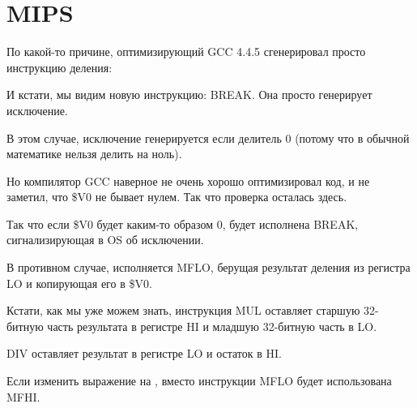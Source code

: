 ﻿\section{MIPS}

По какой-то причине, оптимизирующий GCC 4.4.5 сгенерировал просто инструкцию деления:




И кстати, мы видим новую инструкцию: BREAK. Она просто генерирует исключение.

В этом случае, исключение генерируется если делитель 0 (потому что в обычной математике нельзя
делить на ноль).

Но компилятор GCC наверное не очень хорошо оптимизировал код, и не заметил, что \$V0 не бывает нулем.
Так что проверка осталась здесь.

Так что если \$V0 будет каким-то образом 0, будет исполнена BREAK, сигнализирующая в \ac{OS} 
об исключении.

В противном случае, исполняется MFLO, берущая результат деления из регистра LO и копирующая его в \$V0.


Кстати, как мы уже можем знать, инструкция MUL оставляет старшую 32-битную часть результата
в регистре HI и младшую 32-битную часть в LO.

DIV оставляет результат в регистре LO и остаток в HI.

Если изменить выражение на , вместо инструкции MFLO будет использована MFHI.

